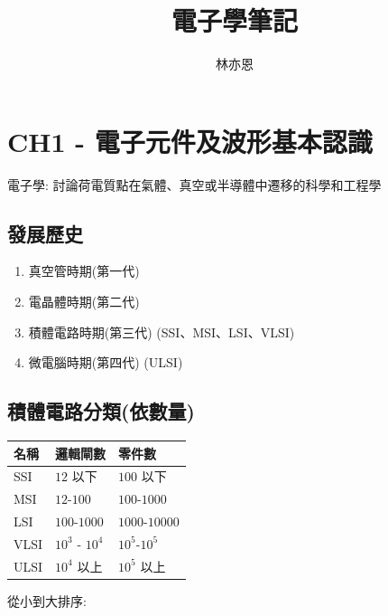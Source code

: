 \documentclass[
]{report}
\title{電子學筆記}
\author{林亦恩}
\date{}
\providecommand{\tightlist}{%
  \setlength{\itemsep}{0pt}\setlength{\parskip}{0pt}}
\begin{document}
\maketitle

\hypertarget{ch1---ux96fbux5b50ux5143ux4ef6ux53caux6ce2ux5f62ux57faux672cux8a8dux8b58}{%
\chapter{CH1 -
電子元件及波形基本認識}\label{ch1---ux96fbux5b50ux5143ux4ef6ux53caux6ce2ux5f62ux57faux672cux8a8dux8b58}}

電子學: 討論荷電質點在氣體、真空或半導體中遷移的科學和工程學

\hypertarget{ux767cux5c55ux6b77ux53f2}{%
\section{發展歷史}\label{ux767cux5c55ux6b77ux53f2}}

\begin{enumerate}
\def\labelenumi{\arabic{enumi}.}
\tightlist
\item
  真空管時期(第一代)
\item
  電晶體時期(第二代)
\item
  積體電路時期(第三代) (SSI、MSI、LSI、VLSI)
\item
  微電腦時期(第四代) (ULSI)
\end{enumerate}

\hypertarget{ux7a4dux9ad4ux96fbux8defux5206ux985eux4f9dux6578ux91cf}{%
\section{積體電路分類(依數量)}\label{ux7a4dux9ad4ux96fbux8defux5206ux985eux4f9dux6578ux91cf}}

\begin{longtable}[]{@{}lll@{}}
\toprule()
名稱 & 邏輯閘數 & 零件數 \\
\midrule()
\endhead
SSI & \(12\) 以下 & \(100\) 以下 \\
MSI & \(12\)-\(100\) & \(100\)-\(1000\) \\
LSI & \(100\)-\(1000\) & \(1000\)-\(10000\) \\
VLSI & \(10^3\) - \(10^4\) & \(10^5\)-\(10^5\) \\
ULSI & \(10^4\) 以上 & \(10^5\) 以上 \\
\bottomrule()
\end{longtable}

從小到大排序:
\end{document}
